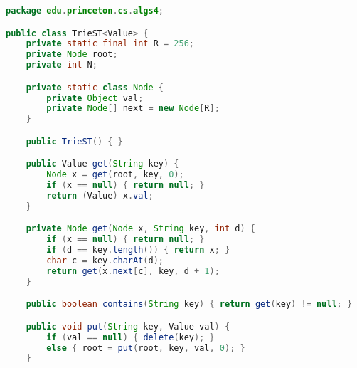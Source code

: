 \documentclass[8pt,a4paper,compress,handout]{beamer}
\begin{document}
\begin{frame}[fragile]
\pause

Trie representation ($R = 26$)

\begin{center}
}
\end{center}
\end{frame}

\begin{frame}[fragile]
\pause

\begin{lstlisting}[language=Java]
package edu.princeton.cs.algs4;

public class TrieST<Value> {
    private static final int R = 256;
    private Node root; 
    private int N; 

    private static class Node {
        private Object val;
        private Node[] next = new Node[R];
    }

    public TrieST() { }

    public Value get(String key) {
        Node x = get(root, key, 0);
        if (x == null) { return null; }
        return (Value) x.val;
    }

    private Node get(Node x, String key, int d) {
        if (x == null) { return null; }
        if (d == key.length()) { return x; }
        char c = key.charAt(d);
        return get(x.next[c], key, d + 1);
    }

    public boolean contains(String key) { return get(key) != null; }

    public void put(String key, Value val) {
        if (val == null) { delete(key); }
        else { root = put(root, key, val, 0); }
    }
\end{lstlisting}
\end{frame}
\end{document}
